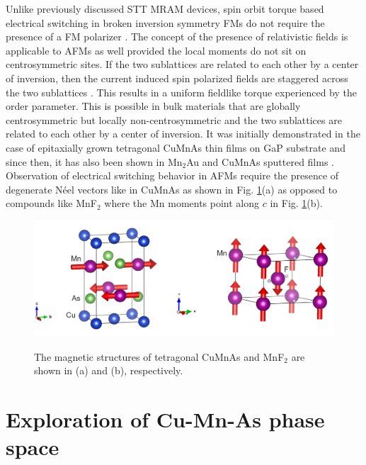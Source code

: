 \documentclass[10pt,doublespacing,edeposit]{uiucthesis2020}
\begin{document}
\begin{mainmatter}
Unlike previously discussed STT MRAM devices, spin orbit torque based electrical switching in broken inversion symmetry FMs do not require the presence of a FM polarizer \cite{Manchon2008}. The concept of the presence of relativistic fields is applicable to AFMs as well provided the local moments do not sit on centrosymmetric sites. If the two sublattices are related to each other by a center of inversion, then the current induced spin polarized fields are staggered across the two sublattices \cite{Zelezny2014,Zelezny2017,Wadley2016}. This results in a uniform fieldlike torque experienced by the order parameter. This is possible in bulk materials that are globally centrosymmetric but locally non-centrosymmetric and the two sublattices are related to each other by a center of inversion. It was initially demonstrated in the case of epitaxially grown tetragonal CuMnAs thin films on GaP substrate \cite{Wadley2016} and since then, it has also been shown in Mn$_2$Au and CuMnAs sputtered films \cite{Meinert2018,Matalla-Wagner2019}. Observation of electrical switching behavior in AFMs require the presence of degenerate N\'eel vectors like in CuMnAs as shown in Fig. \ref{fig:tet-CuMnAs}(a) as opposed to compounds like MnF$_2$ where the Mn moments point along $c$ in Fig. \ref{fig:tet-CuMnAs}(b).


\begin{figure}
\centering\includegraphics[width=\columnwidth]{figures/ch1/CuMnAs-MnF2.png} \\
\caption{\label{fig:tet-CuMnAs}
The magnetic structures of tetragonal CuMnAs and MnF$_2$ are shown in (a) and (b), respectively.
}
\end{figure}

\section{Exploration of Cu-Mn-As phase space}


\end{mainmatter}
\end{document}
